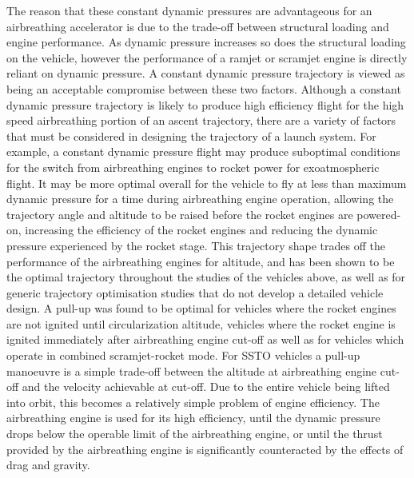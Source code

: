 The reason that these constant dynamic pressures are advantageous for an airbreathing accelerator is due to the trade-off between structural loading and engine performance\cite{Olds1998}. As dynamic pressure increases so does the structural loading on the vehicle, however the performance of a ramjet or scramjet engine is directly reliant on dynamic pressure\cite{Olds1998}. A constant dynamic pressure trajectory is viewed as being an acceptable compromise between these two factors. 
Although a constant dynamic pressure trajectory is likely to produce high efficiency flight for the high speed airbreathing portion of an ascent trajectory, there are a variety of factors that must be considered in designing the trajectory of a launch system. 
For example, a constant dynamic pressure flight may produce suboptimal conditions for the switch from airbreathing engines to rocket power for exoatmospheric flight. 
It may be more optimal overall for the vehicle to fly at less than maximum dynamic pressure for a time during airbreathing engine operation, allowing the trajectory angle and altitude to be raised before the rocket engines are powered-on, increasing the efficiency of the rocket engines and reducing the dynamic pressure experienced by the rocket stage\cite{Tsuchiya2005,Wilhite1991,Mehta2001}.
This trajectory shape trades off the performance of the airbreathing engines for altitude, and has been shown to be the optimal trajectory throughout the studies of the vehicles above\cite{Powell1991,Trefny1999,Roche2000,Pescetelli2012,Young2006,Bradford2000}, as well as for generic trajectory optimisation studies that do not develop a detailed vehicle design\cite{Pescetelli2012,Mooij,Lu1993}.
A pull-up was found to be optimal for vehicles where the rocket engines are not ignited until circularization altitude\cite{Powell1991,Lu1993}, vehicles where the rocket engine is ignited immediately after airbreathing engine cut-off\cite{Trefny1999,Roche2000,Pescetelli2012} as well as for vehicles which operate in combined scramjet-rocket mode\cite{Young2006,Bradford2000}.
For SSTO vehicles a pull-up manoeuvre is a simple trade-off between the altitude at airbreathing engine cut-off and the velocity achievable at cut-off. Due to the entire vehicle being lifted into orbit, this becomes a relatively simple problem of engine efficiency. The airbreathing engine is used for its high efficiency, until the dynamic pressure drops below the operable limit of the airbreathing engine, or until the thrust provided by the airbreathing engine is significantly counteracted by the effects of drag and gravity. 

